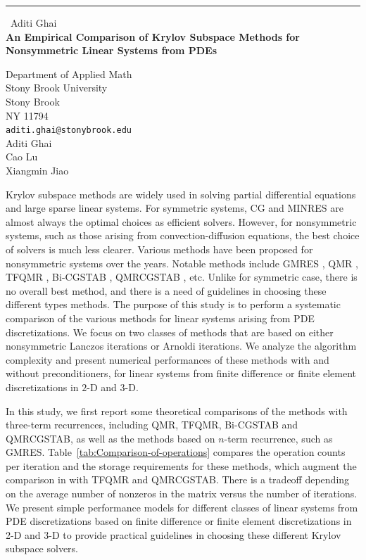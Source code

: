 \documentclass{report}
\begin{document}
\begin{center}
\rule{6in}{1pt} \
{\large Aditi Ghai \\
{\bf An Empirical Comparison of Krylov Subspace Methods for Nonsymmetric Linear Systems from PDEs}}

Department of Applied Math \\ Stony Brook University \\ Stony Brook \\ NY 11794
\\
{\tt aditi.ghai@stonybrook.edu}\\
Aditi Ghai\\
Cao Lu\\
Xiangmin Jiao\end{center}

\providecommand{\tabularnewline}{\\}
Krylov subspace methods are widely used in solving partial differential
equations and large sparse linear systems. For symmetric systems,
CG and MINRES are almost
always the optimal choices as efficient solvers. However, for nonsymmetric
systems, such as those arising from convection-diffusion equations,
the best choice of solvers is much less clearer. Various methods have
been proposed for nonsymmetric systems over the years. Notable methods
include GMRES \cite{gmres}, QMR \cite{qmr}, TFQMR \cite{tfqmr},
Bi-CGSTAB \cite{BSG}, QMRCGSTAB \cite{qcsb}, etc. Unlike for symmetric
case, there is no overall best method, and there is a need of guidelines
in choosing these different types methods. The purpose of this study
is to perform a systematic comparison of the various methods for linear
systems arising from PDE discretizations. We focus on two classes
of methods that are based on either nonsymmetric Lanczos iterations
or Arnoldi iterations. We analyze the algorithm complexity and present
numerical performances of these methods with and without preconditioners,
for linear systems from finite difference or finite element discretizations
in $2$-D and $3$-D.

In this study, we first report some theoretical comparisons of the
methods with three-term recurrences, including QMR, TFQMR, Bi-CGSTAB
and QMRCGSTAB, as well as the methods based on $n$-term recurrence,
such as GMRES. Table~\ref{tab:Comparison-of-operations} compares
the operation counts per iteration and the storage requirements for
these methods, which augment the comparison in \cite{BBC94Templates}
with TFQMR and QMRCGSTAB. There is a tradeoff depending on the average
number of nonzeros in the matrix versus the number of iterations.
We present simple performance models for different classes of linear
systems from PDE discretizations based on finite difference or finite
element discretizations in 2-D and 3-D to provide practical guidelines
in choosing these different Krylov subspace solvers.
\end{document}
